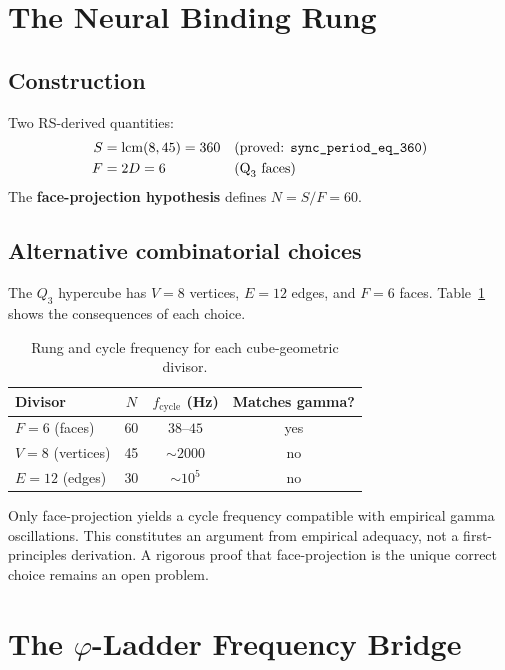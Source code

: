 \documentclass[11pt,a4paper]{article}
\begin{document}
\section{The Neural Binding Rung}
\label{sec:rung}

\subsection{Construction}

Two RS-derived quantities:
\begin{align}
  S &= \operatorname{lcm}(8,45) = 360 && \text{(proved: \texttt{sync\_period\_eq\_360})} \\
  F &= 2D = 6 && \text{(Q}_3\text{ faces)}
\end{align}
The \textbf{face-projection hypothesis} defines $N = S/F = 60$.

\subsection{Alternative combinatorial choices}

The $Q_3$ hypercube has $V=8$ vertices, $E=12$ edges, and $F=6$
faces. Table~\ref{tab:alternatives} shows the consequences of each
choice.

\begin{table}[H]
\centering
\caption{Rung and cycle frequency for each cube-geometric divisor.}
\label{tab:alternatives}
\begin{tabular}{@{}lccc@{}}
\toprule
Divisor & $N$ & $f_{\mathrm{cycle}}$ (Hz) & Matches gamma? \\
\midrule
$F = 6$ (faces)   & 60 & $38$--$45$   & yes \\
$V = 8$ (vertices)& 45 & $\sim 2000$  & no \\
$E = 12$ (edges)  & 30 & $\sim 10^5$  & no \\
\bottomrule
\end{tabular}
\end{table}

\noindent
Only face-projection yields a cycle frequency compatible with
empirical gamma oscillations. This constitutes an argument from
empirical adequacy, not a first-principles derivation. A rigorous
proof that face-projection is the unique correct choice remains an
open problem.

\section{The $\varphi$-Ladder Frequency Bridge}
\label{sec:ladder}
\end{document}
